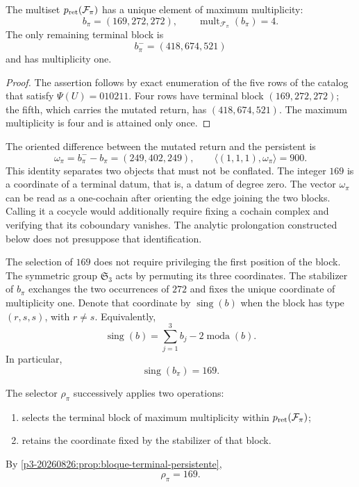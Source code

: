 \begin{proposition}
\label{p3-20260826:prop:bloque-terminal-persistente}
The multiset \(p_{\rm ret}(\mathcal F_\pi)\) has a unique element of
maximum multiplicity:
\[
b_\pi=(169,272,272),
\qquad
\operatorname{mult}_{\mathcal F_\pi}(b_\pi)=4.
\]
The only remaining terminal block is
\[
b_\pi^-=(418,674,521)
\]
and has multiplicity one.
\end{proposition}

\begin{proof}
The assertion follows by exact enumeration of the five rows of the
catalog that satisfy \(\Psi(U)=010211\). Four rows have terminal
block \((169,272,272)\); the fifth, which carries the mutated return, has
\((418,674,521)\). The maximum multiplicity is four and is attained only
once.
\end{proof}

The oriented difference between the mutated return and the persistent is
\[
 \omega_\pi=b_\pi^- - b_\pi=(249,402,249),
 \qquad
 \langle(1,1,1),\omega_\pi\rangle=900.
\]
This identity separates two objects that must not be conflated. The integer
\(169\) is a coordinate of a terminal datum, that is, a datum of degree
zero. The vector \(\omega_\pi\) can be read as a one-cochain
after orienting the edge joining the two blocks. Calling it a cocycle would additionally
require fixing a cochain complex and verifying that its coboundary vanishes.
The analytic prolongation constructed below does not presuppose that
identification.

The selection of \(169\) does not require privileging the first position of the block. The symmetric group \(\mathfrak S_3\) acts by permuting its three coordinates. The stabilizer of \(b_\pi\) exchanges the two occurrences of \(272\) and fixes the unique coordinate of multiplicity one. Denote that coordinate by \(\operatorname{sing}(b)\) when the block has type \((r,s,s)\), with \(r\ne s\). Equivalently,
\[
\operatorname{sing}(b)
=\sum_{j=1}^3b_j-2\operatorname{moda}(b).
\]
In particular,
\[
\boxed{\operatorname{sing}(b_\pi)=169.}
\]

\begin{definition}
\label{p3-20260826:def:selector-residual-pi}
The selector \(\rho_\pi\) successively applies two operations:
\begin{enumerate}
  \item selects the terminal block of maximum multiplicity within
  \(p_{\rm ret}(\mathcal F_\pi)\);
  \item retains the coordinate fixed by the stabilizer of that block.
\end{enumerate}
By \cref{p3-20260826:prop:bloque-terminal-persistente},
\[
\boxed{\rho_\pi=169.}
\]
\end{definition}

